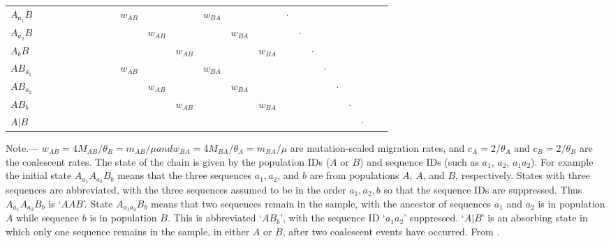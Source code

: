 \documentclass[A4]{article1}
\begin{document}
\begin{table}
\begin{small}
\begin{tabular}{lccccccccccccccccccccccc}
			$A_{a_1}B$ & & & & & & & & & $w_{AB}$ & & & $w_{BA}$ & & & $\cdot$ & & & & & & \\
			$A_{a_2}B$ & & & & & & & & & & $w_{AB}$ & & & $w_{BA}$ & & & $\cdot$ & & & & & \\
			$A_bB$ & & & & & & & & & & & $w_{AB}$ & & & $w_{BA}$ & & & $\cdot$ & & & & \\
			$AB_{a_1}$ & & & & & & & & & $w_{AB}$ & & & $w_{BA}$ & & & & & & $\cdot$ & & & \\
			$AB_{a_2}$ & & & & & & & & & & $w_{AB}$ & & & $w_{BA}$ & & & & & & $\cdot$ & & \\
			$AB_b$ & & & & & & & & & & & $w_{AB}$ & & & $w_{BA}$ & & & & & & $\cdot$ & \\
			$A|B$ & & & & & & & & & & & & & & & & & & & & & $\cdot$ \\
			\bottomrule
		\end{tabular}
		
		\noindent Note.--- $w_{AB} = 4M_{AB}/\theta_B = m_{AB}/\mu and w_{BA} = 4M_{BA}/\theta_A =
		m_{BA}/\mu$ are mutation-scaled migration rates, and $c_A = 2/\theta_A$ and $c_B =
		2/\theta_B$ are the coalescent rates.  The state of the chain is given by the population
		IDs ($A$ or $B$) and sequence IDs (such as $a_1$, $a_2$, $a_1a_2$).  For example the
		initial state $A_{a_1}A_{a_2}B_b$ means that the three sequences $a_1, a_2$, and $b$ are
		from populations $A$, $A$, and $B$, respectively.  States with three sequences are
		abbreviated, with the three sequences assumed to be in the order $a_1, a_2, b$ so that the
		sequence IDs are suppressed. Thus $A_{a_1}A_{a_2}B_b$ is `$AAB$'.  State $A_{a_1a_2}B_b$
		means that two sequences remain in the sample, with the ancestor of sequences $a_1$ and
		$a_2$ is in population $A$ while sequence $b$ is in population $B$. This is abbreviated
		`$AB_b$', with the sequence ID `$a_1a_2$' suppressed.  `$A|B$' is an absorbing state in
		which only one sequence remains in the sample, in either $A$ or $B$, after two coalescent
		events have occurred.  From \citet{Leache2019}.
	\end{small}
\end{table}
\end{document}
